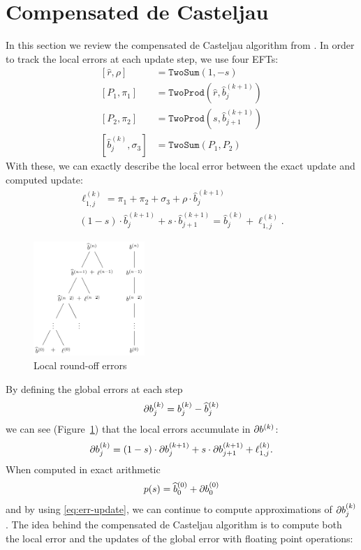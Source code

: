 \section{Compensated de Casteljau}\label{sec:compensated-2}

In this section we review the compensated de Casteljau algorithm
from \cite{Jiang2010}. In order to track the local errors at
each update step, we use four EFTs:
\begin{align}
\left[\widehat{r}, \rho\right] &= \mathtt{TwoSum}(1, -s) \\
\left[P_1, \pi_1\right] &= \mathtt{TwoProd}\left(
    \widehat{r}, \widehat{b}_j^{(k + 1)}\right) \\
\left[P_2, \pi_2\right] &= \mathtt{TwoProd}\left(
    s, \widehat{b}_{j + 1}^{(k + 1)}\right) \\
\left[\widehat{b}_j^{(k)}, \sigma_3\right] &= \mathtt{TwoSum}(P_1, P_2)
\end{align}
With these, we can exactly describe the local error between the exact
update and computed update:
\begin{gather}
\ell_{1, j}^{(k)} = \pi_1 + \pi_2 + \sigma_3 + \rho \cdot
  \widehat{b}_j^{(k + 1)} \label{eq:ell-j} \\
(1 - s) \cdot \widehat{b}_j^{(k + 1)} +
  s \cdot \widehat{b}_{j + 1}^{(k + 1)} =
\widehat{b}_j^{(k)} + \ell_{1, j}^{(k)}.
\end{gather}

\begin{figure}
  \includegraphics[width=0.375\textwidth]{tikz_local_err.pdf}
  \centering
  \captionsetup{width=.75\linewidth}
  \caption{Local round-off errors}
  \label{fig:loc-err-accumulate}
\end{figure}

\noindent By defining the global errors at each step
\begin{equation}
  \db{1}_j^{(k)} = b_j^{(k)} - \widehat{b}_j^{(k)}
\end{equation}
we can see (Figure~\ref{fig:loc-err-accumulate}) that the local errors
accumulate in
\(\db{1}^{(k)}\):
\begin{equation}\label{eq:err-update}
  \db{1}_j^{(k)} = (1 - s) \cdot \db{1}_j^{(k + 1)} + s \cdot
  \db{1}_{j + 1}^{(k + 1)} + \ell_{1, j}^{(k)}.
\end{equation}
When computed in exact arithmetic
\begin{equation}
  p(s) = \widehat{b}_0^{(0)} + \db{1}_0^{(0)}
\end{equation}
and by using \eqref{eq:err-update}, we can continue to compute
approximations of \(\db{1}_j^{(k)}\). The idea behind the compensated
de Casteljau algorithm is to compute both the local error and the updates
of the global error with floating point operations:

